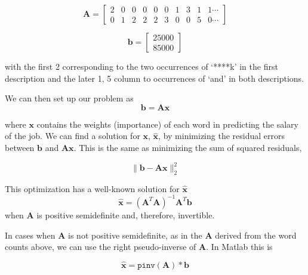 \documentclass[12pt]{article}
\begin{document}
    \begin{equation*}
        \bm{A} = 
        \begin{bmatrix}
           2 & 0 & 0 & 0 & 0 & 0 & 1 & 3 & 1 & 1\cdots\\
	0 & 1 & 2 & 2 & 2 & 3 & 0 & 0 & 5 & 0\cdots
        \end{bmatrix}
    \end{equation*}
	
    \begin{equation*}
        \bm{b} = 
        \begin{bmatrix}
        25000\\
        85000
        \end{bmatrix}
    \end{equation*}

    \noindent with the first 2 corresponding to the two occurrences of `****k'
    in the first description and the later 1, 5 column to occurrences of `and'
    in both descriptions.


    We can then set up our problem as 
    \begin{equation}\label{eq:linsolve}
        \bm{b} = \bm{Ax}
    \end{equation}

    \noindent where $\bm{x}$ contains the weights (importance) of each word in
    predicting the salary of the job. We can find a solution for $\bm{x}$,
    $\bm{\hat{x}}$, by minimizing the residual errors between $\bm{b}$ and
    $\bm{Ax}$.  This is the same as minimizing the sum of squared residuals,

    \begin{equation}
        \|\bm{b} - \bm{Ax}\|^2_2
    \end{equation}

    \noindent This optimization has a well-known solution for $\bm{\hat{x}}$
    \begin{equation}
        \bm{\hat{x}} = (\bm{A}^{T}\bm{A})^{-1}\bm{A}^T\bm{b}
    \end{equation}
    when $\bm{A}$ is positive semidefinite and, therefore, invertible.
    
    In cases when $\bm{A}$ is not positive semidefinite, as in the $\bm{A}$
    derived from the word counts above, we can use the right pseudo-inverse of
    $\bm{A}$.  In Matlab this is 
    
    \begin{equation} 
        \bm{\hat{x}} = \texttt{pinv}(\bm{A})*\bm{b}
    \end{equation}
\end{document}

